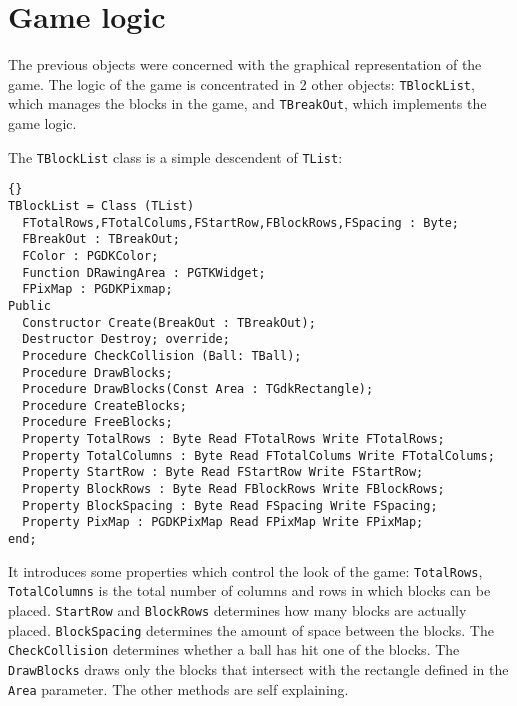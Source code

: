 \documentclass[10pt]{article}
\newcommand{\var}[1]{\texttt{#1}}
\begin{document}
\section{Game logic}
The previous objects were concerned with the graphical representation of the
game. The logic of the game is concentrated in 2 other objects: \var{TBlockList},
 which manages the blocks in the game, and \var{TBreakOut}, which implements the
game logic.

The \var{TBlockList} class is a simple descendent of \var{TList}:
\begin{lstlisting}{}
TBlockList = Class (TList)
  FTotalRows,FTotalColums,FStartRow,FBlockRows,FSpacing : Byte;
  FBreakOut : TBreakOut;
  FColor : PGDKColor;
  Function DRawingArea : PGTKWidget;
  FPixMap : PGDKPixmap;
Public 
  Constructor Create(BreakOut : TBreakOut);
  Destructor Destroy; override;
  Procedure CheckCollision (Ball: TBall);
  Procedure DrawBlocks;
  Procedure DrawBlocks(Const Area : TGdkRectangle);
  Procedure CreateBlocks;
  Procedure FreeBlocks;
  Property TotalRows : Byte Read FTotalRows Write FTotalRows;
  Property TotalColumns : Byte Read FTotalColums Write FTotalColums;
  Property StartRow : Byte Read FStartRow Write FStartRow;
  Property BlockRows : Byte Read FBlockRows Write FBlockRows;
  Property BlockSpacing : Byte Read FSpacing Write FSpacing; 
  Property PixMap : PGDKPixMap Read FPixMap Write FPixMap;
end;
\end{lstlisting}
It introduces some properties which control the look of the game:
\var{TotalRows}, \var{TotalColumns} is the total number of columns 
and rows in which blocks can be placed. \var{StartRow} and \var{BlockRows}
determines how many blocks are actually placed. \var{BlockSpacing} determines
the amount of space between the blocks. The \var{CheckCollision} determines
whether a ball has hit one of the blocks. The \var{DrawBlocks} draws only the blocks
that intersect with the rectangle defined in the \var{Area} parameter.
The other methods are self explaining.
\end{document}
